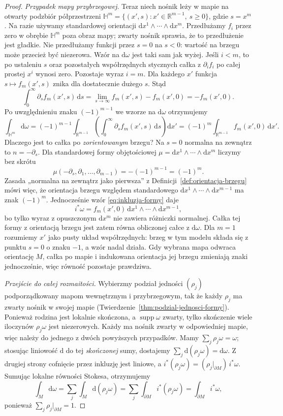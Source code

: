 \documentclass[11pt,a4paper,oneside]{report}
\newcommand{\R}{\mathbb{R}}
\newcommand{\supp}{\operatorname{supp}}
\newcommand{\dd}{\mathrm d}
\theoremstyle{plain}
\theoremstyle{definition}
\theoremstyle{remark}
\begin{document}
\begin{proof}
\emph{Przypadek mapy przybrzegowej.}
Teraz niech nośnik leży w mapie na otwarty
podzbiór półprzestrzeni
$\mathbb H^m=\{(x',s):x'\in\R^{m-1},\ s\geq0\}$,
gdzie $s=x^m$. Na razie używamy standardowej
orientacji $\dd x^1\wedge\cdots\wedge\dd x^m$.
Przedłużamy $f_i$ przez zero w obrębie
$\mathbb H^m$ poza obraz mapy; zwarty nośnik
sprawia, że to przedłużenie jest gładkie.
Nie przedłużamy funkcji przez $s=0$ na $s<0$:
wartość na brzegu może przecież być niezerowa.
Wzór na $\dd\omega$ jest taki sam jak wyżej.
Jeśli $i<m$, to po ustaleniu $s$ oraz pozostałych
współrzędnych stycznych całka z $\partial_i f_i$
po całej prostej $x^i$ wynosi zero.
Pozostaje wyraz $i=m$. Dla każdego $x'$ funkcja
$s\mapsto f_m(x',s)$ znika dla dostatecznie
dużego $s$. Stąd
\[
 \int_0^\infty\partial_s f_m(x',s)\,\dd s
 =\lim_{s\to\infty}f_m(x',s)-f_m(x',0)
 =-f_m(x',0).
\]
Po uwzględnieniu znaku $(-1)^{m-1}$ we wzorze
na $\dd\omega$ otrzymujemy
\[
 \int_{\mathbb H^m}\dd\omega
 =(-1)^{m-1}\int_{\R^{m-1}}
  \left(\int_0^\infty\partial_s f_m(x',s)\,\dd s\right)
          \dd x'
 =(-1)^m\int_{\R^{m-1}} f_m(x',0)\,\dd x'.
\]
Dlaczego jest to całka po \emph{zorientowanym}
brzegu? Na $s=0$ normalna na zewnątrz to
$n=-\partial_s$. Dla standardowej formy
objętościowej $\mu=\dd x^1\wedge\cdots\wedge\dd x^m$
liczymy bez skrótu
\[
 \mu(-\partial_s,\partial_1,\ldots,\partial_{m-1})
 =-(-1)^{m-1}=(-1)^m.
\]
Zasada „normalna na zewnątrz jako pierwsza”
z Definicji~\ref{def:orientacja-brzegu} mówi więc,
że orientacja brzegu względem standardowego
$\dd x^1\wedge\cdots\wedge\dd x^{m-1}$
ma znak $(-1)^m$. Jednocześnie wzór
\eqref{eq:inkluzja-formy} daje
\[
 i^*\omega=f_m(x',0)\,
 \dd x^1\wedge\cdots\wedge\dd x^{m-1},
\]
bo tylko wyraz z opuszczonym $\dd x^m$
nie zawiera różniczki normalnej. Całka tej
formy z orientacją brzegu jest zatem równa
obliczonej całce z $\dd\omega$.
Dla $m=1$ rozumiemy $x'$ jako pusty układ
współrzędnych: brzeg w tym modelu składa się
z punktu $s=0$ o znaku $-1$, a wzór nadal działa.
Gdy wybrana mapa odwraca orientację $M$,
całka po mapie i indukowana orientacja jej brzegu
zmieniają znaki jednocześnie, więc równość
pozostaje prawdziwa.

\emph{Przejście do całej rozmaitości.}
Wybierzmy podział jedności $(\rho_j)$
podporządkowany mapom wewnętrznym i przybrzegowym,
tak że każdy $\rho_j$ ma zwarty nośnik w swojej
mapie (Twierdzenie~\ref{thm:podzial-jednosci-formy}).
Ponieważ rodzina jest lokalnie skończona, a
$\supp\omega$ zwarty, tylko skończenie wiele
iloczynów $\rho_j\omega$ jest niezerowych.
Każdy ma nośnik zwarty w odpowiedniej mapie,
więc należy do jednego z dwóch powyższych
przypadków. Mamy $\sum_j\rho_j\omega=\omega$;
stosując liniowość $\dd$ do tej \emph{skończonej}
sumy, dostajemy $\sum_j\dd(\rho_j\omega)=\dd\omega$.
Z drugiej strony cofnięcie przez inkluzję jest
liniowe, a $i^*(\rho_j\omega)
=(\rho_j|_{\partial M})\,i^*\omega$.
Sumując lokalne równości Stokesa, otrzymujemy
\[
 \int_M\dd\omega
 =\sum_j\int_M\dd(\rho_j\omega)
 =\sum_j\int_{\partial M}i^*(\rho_j\omega)
 =\int_{\partial M}i^*\omega,
\]
ponieważ $\sum_j\rho_j|_{\partial M}=1$.
\end{proof}
\end{document}
